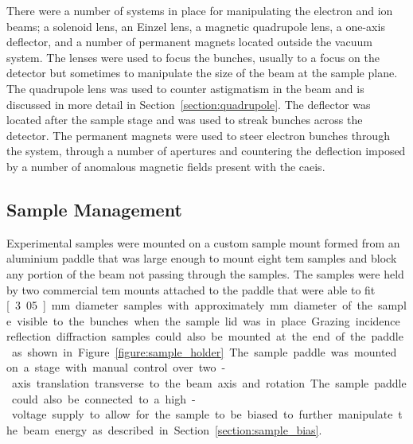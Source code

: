 There were a number of systems in place for manipulating the electron and ion beams; a solenoid lens, an Einzel lens, a magnetic quadrupole lens, a one-axis deflector, and a number of permanent magnets located outside the vacuum system.
The lenses were used to focus the bunches, usually to a focus on the detector but sometimes to manipulate the size of the beam at the sample plane.
The quadrupole lens was used to counter astigmatism in the beam and is discussed in more detail in Section~\ref{section:quadrupole}.
The deflector was located after the sample stage and was used to streak bunches across the detector.
The permanent magnets were used to steer electron bunches through the system, through a number of apertures and countering the deflection imposed by a number of anomalous magnetic fields present with the \gls{caeis}.

\subsection{Sample Management}

Experimental samples were mounted on a custom sample mount formed from an aluminium paddle that was large enough to mount eight \gls{tem} samples and block any portion of the beam not passing through the samples.
The samples were held by two commercial \gls{tem} mounts attached to the paddle that were able to fit \unit[3.05]{mm} diameter samples with approximately \unit[2]{mm} diameter of the sample visible to the bunches when the sample lid was in place.
Grazing incidence reflection diffraction samples could also be mounted at the end of the paddle as shown in Figure~\ref{figure:sample_holder}.
The sample paddle was mounted on a stage with manual control over two-axis translation transverse to the beam axis and rotation.
The sample paddle could also be connected to a high-voltage supply to allow for the sample to be biased to further manipulate the beam energy as described in Section~\ref{section:sample_bias}.

